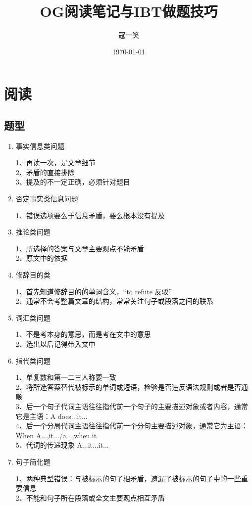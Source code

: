\documentclass[UTF8]{ctexart}
\begin{document}
\title{OG阅读笔记与IBT做题技巧}
\author{寇一笑}
\date{\today}
\maketitle
\newpage
\tableofcontents
\newpage
\section{阅读}
\subsection{题型}
\begin{enumerate}[A]
\item 事实信息类问题\par
  1、再读一次，是文章细节\\
  2、矛盾的直接排除\\
  3、提及的不一定正确，必须针对题目\\
\item 否定事实类信息问题\par
  1、错误选项要么于信息矛盾，要么根本没有提及
\item 推论类问题\par
1、所选择的答案与文章主要观点不能矛盾\\
2、原文中的依据\\
\item 修辞目的类\par
1、首先知道修辞目的的单词含义，“to refute 反驳”\\
2、通常不会考整篇文章的结构，常常关注句子或段落之间的联系\\
\item 词汇类问题\par
1、不是考本身的意思，而是考在文中的意思\\
2、选出以后记得带入文中\\
\item 指代类问题\par
1、单复数和第一二三人称要一致\\
2、将所选答案替代被标示的单词或短语，检验是否违反语法规则或者是否通顺\\
3、后一个句子代词主语往往指代前一个句子的主要描述对象或者内容，通常它是主语：A does...it...\\
4、后一个分局代词主语往往指代前一个分句主要描述对象，通常它为主语：When A...,it.../a...,when it\\
5、代词的传递现象 A...it...it...\\
\item 句子简化题\par
1、两种典型错误：与被标示的句子相矛盾，遗漏了被标示的句子中的一些重要信息\\
2、不能和句子所在段落或全文主要观点相互矛盾\\


\end{enumerate}
\end{document}
